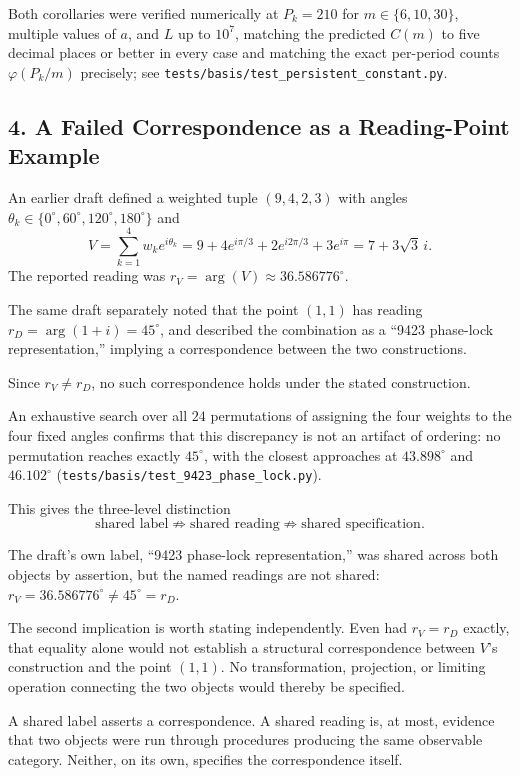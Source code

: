 \documentclass[
]{article}
\begin{document}
Both corollaries were verified numerically at \(P_k=210\) for
\(m\in\{6,10,30\}\), multiple values of \(a\), and \(L\) up to \(10^7\),
matching the predicted \(C(m)\) to five decimal places or better in
every case and matching the exact per-period counts \(\varphi(P_k/m)\)
precisely; see \texttt{tests/basis/test\_persistent\_constant.py}.

\subsection{4. A Failed Correspondence as a Reading-Point
Example}\label{a-failed-correspondence-as-a-reading-point-example}

An earlier draft defined a weighted tuple \((9,4,2,3)\) with angles
\(\theta_k\in\{0^\circ,60^\circ,120^\circ,180^\circ\}\) and \[
V = \sum_{k=1}^4 w_k e^{i\theta_k} = 9 + 4e^{i\pi/3} + 2e^{i2\pi/3} + 3e^{i\pi} = 7 + 3\sqrt3\,i.
\] The reported reading was \(r_V = \arg(V) \approx 36.586776^\circ\).

The same draft separately noted that the point \((1,1)\) has reading
\(r_D=\arg(1+i)=45^\circ\), and described the combination as a ``9423
phase-lock representation,'' implying a correspondence between the two
constructions.

Since \(r_V\ne r_D\), no such correspondence holds under the stated
construction.

An exhaustive search over all \(24\) permutations of assigning the four
weights to the four fixed angles confirms that this discrepancy is not
an artifact of ordering: no permutation reaches exactly \(45^\circ\), with
the closest approaches at \(43.898^\circ\) and \(46.102^\circ\)
(\texttt{tests/basis/test\_9423\_phase\_lock.py}).

This gives the three-level distinction \[
\text{shared label} \not\Rightarrow \text{shared reading} \not\Rightarrow \text{shared specification.}
\]

The draft's own label, ``9423 phase-lock representation,'' was shared
across both objects by assertion, but the named readings are not shared:
\(r_V=36.586776^\circ \ne 45^\circ = r_D\).

The second implication is worth stating independently. Even had
\(r_V=r_D\) exactly, that equality alone would not establish a
structural correspondence between \(V\)'s construction and the point
\((1,1)\). No transformation, projection, or limiting operation
connecting the two objects would thereby be specified.

A shared label asserts a correspondence. A shared reading is, at most,
evidence that two objects were run through procedures producing the same
observable category. Neither, on its own, specifies the correspondence
itself.
\end{document}
